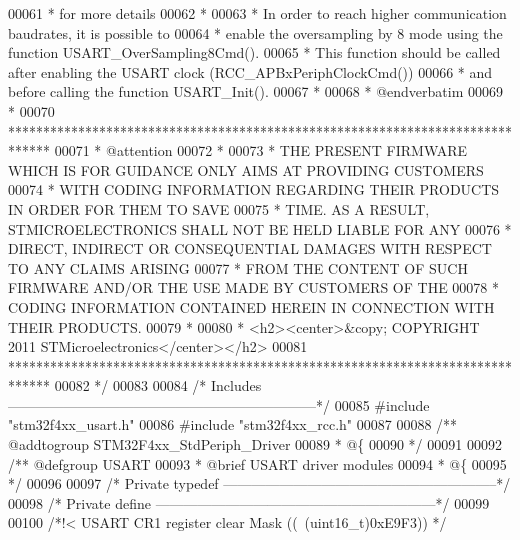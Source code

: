 \begin{DoxyCode}
00061 \textcolor{comment}{  *          for more details}
00062 \textcolor{comment}{  *          }
00063 \textcolor{comment}{  *          In order to reach higher communication baudrates, it is possible to}
00064 \textcolor{comment}{  *          enable the oversampling by 8 mode using the function USART\_OverSampling8Cmd().}
00065 \textcolor{comment}{  *          This function should be called after enabling the USART clock (RCC\_APBxPeriphClockCmd())}
00066 \textcolor{comment}{  *          and before calling the function USART\_Init().}
00067 \textcolor{comment}{  *          }
00068 \textcolor{comment}{  *  @endverbatim}
00069 \textcolor{comment}{  *        }
00070 \textcolor{comment}{  ******************************************************************************}
00071 \textcolor{comment}{  * @attention}
00072 \textcolor{comment}{  *}
00073 \textcolor{comment}{  * THE PRESENT FIRMWARE WHICH IS FOR GUIDANCE ONLY AIMS AT PROVIDING CUSTOMERS}
00074 \textcolor{comment}{  * WITH CODING INFORMATION REGARDING THEIR PRODUCTS IN ORDER FOR THEM TO SAVE}
00075 \textcolor{comment}{  * TIME. AS A RESULT, STMICROELECTRONICS SHALL NOT BE HELD LIABLE FOR ANY}
00076 \textcolor{comment}{  * DIRECT, INDIRECT OR CONSEQUENTIAL DAMAGES WITH RESPECT TO ANY CLAIMS ARISING}
00077 \textcolor{comment}{  * FROM THE CONTENT OF SUCH FIRMWARE AND/OR THE USE MADE BY CUSTOMERS OF THE}
00078 \textcolor{comment}{  * CODING INFORMATION CONTAINED HEREIN IN CONNECTION WITH THEIR PRODUCTS.}
00079 \textcolor{comment}{  *}
00080 \textcolor{comment}{  * <h2><center>&copy; COPYRIGHT 2011 STMicroelectronics</center></h2>}
00081 \textcolor{comment}{  ******************************************************************************  }
00082 \textcolor{comment}{  */}
00083 
00084 \textcolor{comment}{/* Includes ------------------------------------------------------------------*/}
00085 \textcolor{preprocessor}{#}\textcolor{preprocessor}{include} "stm32f4xx_usart.h"
00086 \textcolor{preprocessor}{#}\textcolor{preprocessor}{include} "stm32f4xx_rcc.h"
00087 
00088 \textcolor{comment}{/** @addtogroup STM32F4xx\_StdPeriph\_Driver}
00089 \textcolor{comment}{  * @\{}
00090 \textcolor{comment}{  */}
00091 
00092 \textcolor{comment}{/** @defgroup USART }
00093 \textcolor{comment}{  * @brief USART driver modules}
00094 \textcolor{comment}{  * @\{}
00095 \textcolor{comment}{  */}
00096 
00097 \textcolor{comment}{/* Private typedef -----------------------------------------------------------*/}
00098 \textcolor{comment}{/* Private define ------------------------------------------------------------*/}
00099 
00100 \textcolor{comment}{/*!< USART CR1 register clear Mask ((~(uint16\_t)0xE9F3)) */}

\end{DoxyCode}
